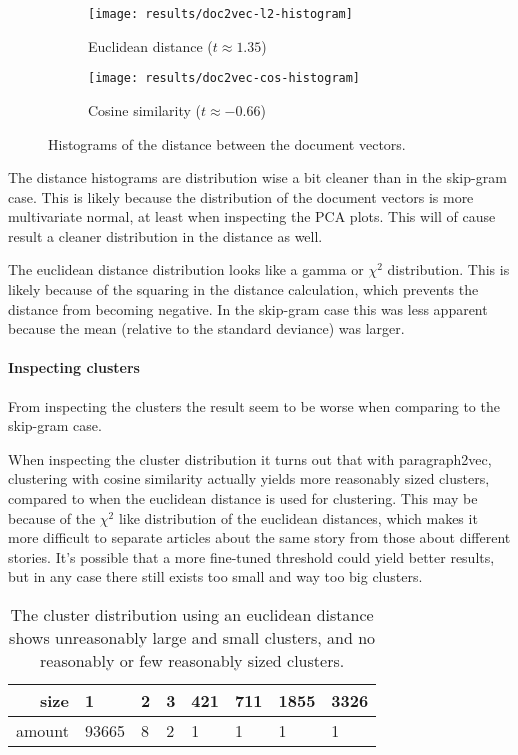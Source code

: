 \begin{figure}[H]
        \centering
        \begin{subfigure}[b]{0.49\textwidth}
                \texttt{[image: results/doc2vec-l2-histogram]}
                \caption{Euclidean distance ($t \approx 1.35$)}
        \end{subfigure}
        \begin{subfigure}[b]{0.49\textwidth}
                \texttt{[image: results/doc2vec-cos-histogram]}
                \caption{Cosine similarity ($t \approx -0.66$)}
        \end{subfigure}
        \caption{Histograms of the distance between the document vectors.}
\end{figure}

The distance histograms are distribution wise a bit cleaner than in the skip-gram case. This is likely because the distribution of the document vectors is more multivariate normal, at least when inspecting the PCA plots. This will of cause result a cleaner distribution in the distance as well.

The euclidean distance distribution looks like a gamma or $\chi^2$ distribution. This is likely because of the squaring in the distance calculation, which prevents the distance from becoming negative. In the skip-gram case this was less apparent because the mean (relative to the standard deviance) was larger.

\paragraph{Inspecting clusters} From inspecting the clusters the result seem to be worse when comparing to the skip-gram case.

When inspecting the cluster distribution it turns out that with paragraph2vec, clustering with cosine similarity actually yields more reasonably sized clusters, compared to when the euclidean distance is used for clustering. This may be because of the $\chi^2$ like distribution of the euclidean distances, which makes it more difficult to separate articles about the same story from those about different stories. It's possible that a more fine-tuned threshold could yield better results, but in any case there still exists too small and way too big clusters.

\begin{table}[H]
\centering
\begin{tabular}{r|l l l l l l l }
size & 1 & 2 & 3 & 421 & 711 & 1855 & 3326 \\ \hline
amount & 93665 & 8 & 2 & 1 & 1 & 1 & 1
\end{tabular}
\caption{The cluster distribution using an euclidean distance shows unreasonably large and small clusters, and no reasonably or few reasonably sized clusters.}
\end{table}

